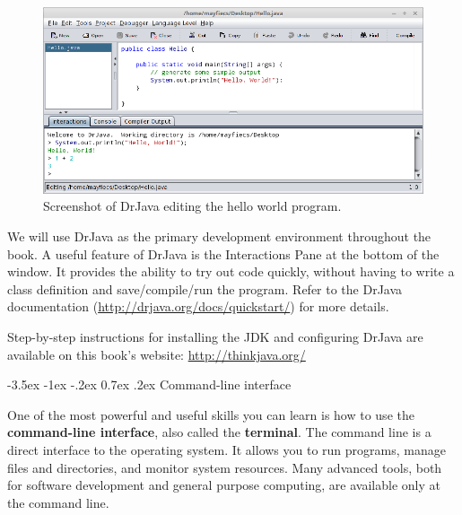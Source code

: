 \documentclass[12pt]{book}
\makeatletter
\theoremstyle{exercise}
\renewcommand{\section}{\@startsection{section}{1}{\z@}%
    {-3.5ex \@plus -1ex \@minus -.2ex}%
    {0.7ex \@plus.2ex}%
    {\normalfont\Large\bfseries}}
\makeatother
\begin{document}
\begin{figure}[!h]
\begin{center}
\includegraphics[width=\textwidth]{figs/drjava-hello.png}
\caption{Screenshot of DrJava editing the hello world program.}
\end{center}
\end{figure}


We will use DrJava as the primary development environment throughout the book.
A useful feature of DrJava is the Interactions Pane at the bottom of the window.
It provides the ability to try out code quickly, without having to write a class definition and save/compile/run the program.
Refer to the DrJava documentation (\url{http://drjava.org/docs/quickstart/}) for more details.

Step-by-step instructions for installing the JDK and configuring DrJava are available on this book's website: \url{http://thinkjava.org/}



\section{Command-line interface}
\label{commandline}


One of the most powerful and useful skills you can learn is how to use the {\bf command-line interface}, also called the {\bf terminal}.
The command line is a direct interface to the operating system.
It allows you to run programs, manage files and directories, and monitor system resources.
Many advanced tools, both for software development and general purpose computing, are available only at the command line.
\end{document}
